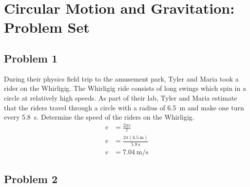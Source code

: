 \documentclass{article}
\begin{document}
\newcommand{\hr}{\par\noindent\rule{\textwidth}{0.4pt}}

\newcommand{\bc}[1]{
	\begin{equation*}
		\begin{boxed}
			{#1}
		\end{boxed}
	\end{equation*}
}

\newcommand{\cond}[2]{
	\ifmmode
		{#1} \quad {#2}
	\else
		$$ {#1} \quad {#2} $$
	\fi
}

\newcommand{\matr}[1]{
	\ifmmode \bm{#1}
	\else \textit{\textbf{#1}}
	\fi
}
\newcommand{\vect}[1]{
	\ifmmode \mathbf{#1}
	\else \textbf{#1}
	\fi
}


\tableofcontents

\section{Circular Motion and Gravitation: Problem Set}

\subsection{Problem 1}

During their physics field trip to the amusement park, Tyler and Maria took a rider on the Whirligig. The Whirligig ride consists of long swings which spin in a circle at relatively high speeds. As part of their lab, Tyler and Maria estimate that the riders travel through a circle with a radius of \SI{6.5}{\meter} and make one turn every \SI{5.8}{\second}. Determine the speed of the riders on the Whirligig.
\begin{align*}
	v & = \frac{ 2\pi r }{ t } \\
	v & = \frac{ 2\pi(\SI{6.5}{\meter}) }{ \SI{5.8}{\second} } \\
	v & = \SI{7.04}{\meter \per \second}
\end{align*}

\subsection{Problem 2}
\end{document}
